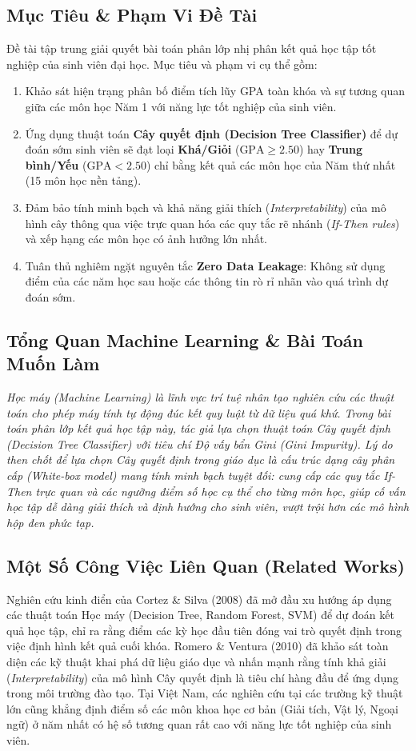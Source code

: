 \documentclass[12pt,a4paper]{article}
\begin{document}
\subsection{Mục Tiêu \& Phạm Vi Đề Tài}
Đề tài tập trung giải quyết bài toán phân lớp nhị phân kết quả học tập tốt nghiệp của sinh viên đại học. Mục tiêu và phạm vi cụ thể gồm:
\begin{enumerate}
    \item Khảo sát hiện trạng phân bố điểm tích lũy GPA toàn khóa và sự tương quan giữa các môn học Năm 1 với năng lực tốt nghiệp của sinh viên.
    \item Ứng dụng thuật toán \textbf{Cây quyết định (Decision Tree Classifier)} để dự đoán sớm sinh viên sẽ đạt loại \textbf{Khá/Giỏi} ($\text{GPA} \ge 2.50$) hay \textbf{Trung bình/Yếu} ($\text{GPA} < 2.50$) chỉ bằng kết quả các môn học của Năm thứ nhất (15 môn học nền tảng).
    \item Đảm bảo tính minh bạch và khả năng giải thích (\textit{Interpretability}) của mô hình cây thông qua việc trực quan hóa các quy tắc rẽ nhánh (\textit{If-Then rules}) và xếp hạng các môn học có ảnh hưởng lớn nhất.
    \item Tuân thủ nghiêm ngặt nguyên tắc \textbf{Zero Data Leakage}: Không sử dụng điểm của các năm học sau hoặc các thông tin rò rỉ nhãn vào quá trình dự đoán sớm.
\end{enumerate}

\subsection{Tổng Quan Machine Learning \& Bài Toán Muốn Làm}
\textit{Học máy (Machine Learning) là lĩnh vực trí tuệ nhân tạo nghiên cứu các thuật toán cho phép máy tính tự động đúc kết quy luật từ dữ liệu quá khứ. Trong bài toán phân lớp kết quả học tập này, tác giả lựa chọn thuật toán Cây quyết định (Decision Tree Classifier) với tiêu chí Độ vấy bẩn Gini (Gini Impurity). Lý do then chốt để lựa chọn Cây quyết định trong giáo dục là cấu trúc dạng cây phân cấp (White-box model) mang tính minh bạch tuyệt đối: cung cấp các quy tắc If-Then trực quan và các ngưỡng điểm số học cụ thể cho từng môn học, giúp cố vấn học tập dễ dàng giải thích và định hướng cho sinh viên, vượt trội hơn các mô hình hộp đen phức tạp.}

\subsection{Một Số Công Việc Liên Quan (Related Works)}
Nghiên cứu kinh điển của Cortez \& Silva (2008) \cite{cortez2008} đã mở đầu xu hướng áp dụng các thuật toán Học máy (Decision Tree, Random Forest, SVM) để dự đoán kết quả học tập, chỉ ra rằng điểm các kỳ học đầu tiên đóng vai trò quyết định trong việc định hình kết quả cuối khóa. Romero \& Ventura (2010) \cite{romero2010} đã khảo sát toàn diện các kỹ thuật khai phá dữ liệu giáo dục và nhấn mạnh rằng tính khả giải (\textit{Interpretability}) của mô hình Cây quyết định là tiêu chí hàng đầu để ứng dụng trong môi trường đào tạo. Tại Việt Nam, các nghiên cứu tại các trường kỹ thuật lớn cũng khẳng định điểm số các môn khoa học cơ bản (Giải tích, Vật lý, Ngoại ngữ) ở năm nhất có hệ số tương quan rất cao với năng lực tốt nghiệp của sinh viên.
\end{document}
